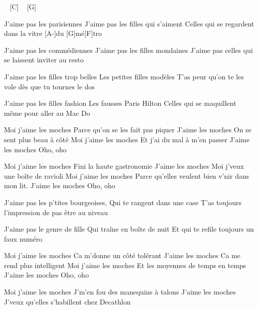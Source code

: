 
\begin{guitar}
[F] ~ [C] ~ [G] 

J'aime pas les parisiennes
J'aime pas les filles qui s'aiment
Celles qui se regardent dans la vitre [A-]du [G]mé[F]tro

J'aime pas les commédiennes
J'aime pas les filles mondaines
J'aime pas celles qui se laissent inviter au resto

J'aime pas les filles trop belles
Les petites filles modèles
T'as peur qu'on te les vole dès que tu tournes le dos

J'aime pas les filles fashion
Les fausses Paris Hilton
Celles qui se maquillent même pour aller au Mac Do

Moi j'aime les moches
Parce qu'on se les fait pas piquer
J'aime les moches
On se sent plus beau à côté
Moi j'aime les moches
Et j'ai du mal à m'en passer
J'aime les moches
Oho, oho

Moi j'aime les moches
Fini la haute gastronomie
J'aime les moches
Moi j'veux une boîte de ravioli
Moi j'aime les moches
Parce qu'elles veulent bien v'nir dans mon lit.
J'aime les moches
Oho, oho

J'aime pas les p'tites bourgeoises,
Qui te rangent dans une case
T'as toujours l'impression de pas être au niveau

J'aime pas le genre de fille
Qui traîne en boîte de nuit
Et qui te refile toujours un faux numéro

Moi j'aime les moches
Ca m'donne un côté tolérant
J'aime les moches
Ca me rend plus intelligent
Moi j'aime les moches
Et les moyennes de temps en temps
J'aime les moches
Oho, oho

Moi j'aime les moches
J'm'en fou des manequins à talons
J'aime les moches
J'veux qu'elles s'habillent chez Decathlon

\end{guitar}